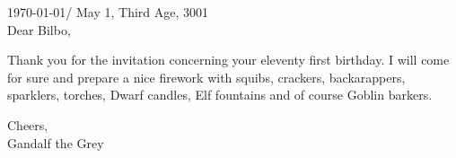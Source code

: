 \newcommand{\lang}{english}
\newcommand{\name}{Gandalf the Grey}
\newcommand{\street}{Rivendell}
\newcommand{\zipCity}{Eriador, Middle Earth}
\newcommand{\mobile}{use a Palant\'ir}
\newcommand{\email}{use Quick Post}
\newcommand{\dateposted}{\today / May 1, Third Age, 3001}

\newcommand{\recipient}{
Bilbo Baggins\\
Bag End, Hobbiton\\
The Shire, Middle Earth\\
}




\address
\textit{\textbf{My Friend Bilbo}} \hfill \dateposted \\[5mm]

Dear Bilbo,

Thank you for the invitation concerning your eleventy first birthday.
I will come for sure and prepare a nice firework with squibs, crackers, backarappers, sparklers, torches, Dwarf candles, Elf fountains and of course Goblin barkers.


Cheers,\\[1em]

\name


 
